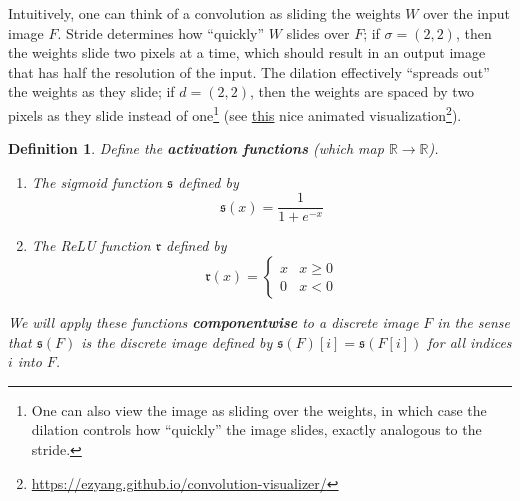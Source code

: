 \documentclass{article}
\newcommand{\R}{\mathbb{R}}
\newtheorem{defn}{Definition}
\begin{document}
	Intuitively, one can think of a convolution as sliding the weights \(W\) over the input image \(F\). Stride determines how ``quickly'' \(W\) slides over \(F\); if \(\sigma=(2,2)\), then the weights slide two pixels at a time, which should result in an output image that has half the resolution of the input. The dilation effectively ``spreads out'' the weights as they slide; if \(d = (2, 2)\), then the weights are spaced by two pixels as they slide instead of one\footnote{One can also view the image as sliding over the weights, in which case the dilation controls how ``quickly'' the image slides, exactly analogous to the stride.} (see \href{https://ezyang.github.io/convolution-visualizer/}{this} nice animated visualization\footnote{\url{https://ezyang.github.io/convolution-visualizer/}}).
	
	\newcommand{\sigmoid}{\mathfrak{s}}
	\newcommand{\relu}{\mathfrak{r}}
	\begin{defn}\label{def:activation_functions}
		Define the \textbf{activation functions} (which map \(\R \to \R\)).
		\begin{enumerate}
			\item The sigmoid function \(\sigmoid\) defined by
			\begin{equation}
				\label{eq:sigmoid}
				\sigmoid(x) = \frac{1}{1 + e^{-x}}
			\end{equation}
			\item The ReLU function \(\relu\) defined by
			\begin{equation}
				\label{eq:relu}
				\relu(x) = \begin{cases}
					x & x \ge 0 \\
					0 & x < 0
				\end{cases}
			\end{equation}
		\end{enumerate}
		We will apply these functions \textbf{componentwise} to a discrete image \(F\) in the sense that
		\(\sigmoid(F)\) is the discrete image defined by \(\sigmoid(F)[i] = \sigmoid(F[i])\) for all indices \(i\) into \(F\).
	\end{defn}
\end{document}
